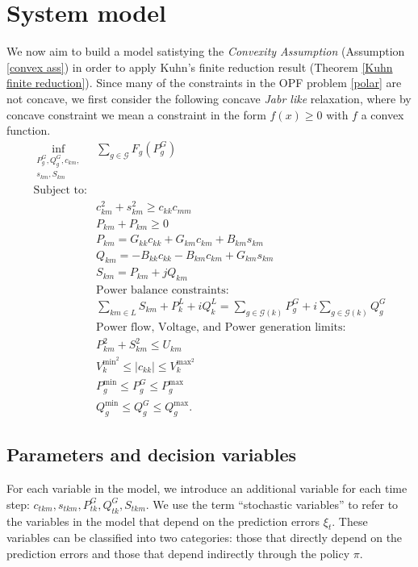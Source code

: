 \documentclass[11pt,a4paper,oneside,openany]{book}
\numberwithin{definition}{section}
\numberwithin{theorem}{section}
\numberwithin{problem}{section}
\begin{document}
\section{System model}
We now aim to build a model satistying the \emph{Convexity Assumption} (Assumption \ref{convex ass}) in order to apply Kuhn's finite reduction result (Theorem \ref{Kuhn finite reduction}). Since many of the constraints in the OPF problem \eqref{polar} are not concave, we first consider the following concave \emph{Jabr like} relaxation, where by concave constraint we mean a constraint in the form $f(x) \geq 0$ with $f$ a convex function.
\begin{align}
\label{Jabr concave relaxation}
\inf_{\substack{P^G_g, Q^G_g, c_{km},\\s_{km}, S_{km}}} & \sum_{g \in \mathcal{G}}{F_g(P_g^G)} \\
\text{Subject to:} & \nonumber \\ \label{concave Jabr constraint}
& c_{km}^2 + s_{km}^2 \geq c_{kk}c_{mm}\\ \label{power loss inequality}
& P_{km}+P_{km} \geq 0 \\ \label{active power flow}
& P_{km} = G_{kk}c_{kk}+G_{km}c_{km}+B_{km}s_{km} \\ \label{reactive power flow}
& Q_{km} = -B_{kk}c_{kk}-B_{km}c_{km}+G_{km}s_{km} \\
\label{cartesian to complex}
& S_{km} = P_{km} + jQ_{km}\\
& \text{Power balance constraints:} \nonumber \\  \label{power injection constraint}
& \sum_{km \in L}S_{km}+P_k^L+iQ_k^L = \sum_{g \in \mathcal{G}(k)}{P_g^G} + i\sum_{g \in \mathcal{G}(k)}{Q_g^G}  \\
& \text{Power flow, Voltage, and Power generation limits:} \nonumber \\ \label{power flow magnitude constraint}
& P_{km}^2 + S_{km}^2 \leq U_{km} \\ \label{voltage magnitude constraint}
& {V_k^{\text{min}^2}} \leq |c_{kk}| \leq {V_k^{\text{max}^2}} \\ \label{power generation constraint a}
& P_g^{\text{min}} \leq P_g^G \leq P_g^{\text{max}} \\
\label{power generation constraint b}
& Q_g^{\text{min}} \leq Q_g^G \leq Q_g^{\text{max}} .
\end{align}



\subsection{Parameters and decision variables}
For each variable in the model, we introduce an additional variable for each time step: $c_{tkm}, s_{tkm}, P^G_{tk}, Q^G_{tk}, S_{tkm}$. We use the term ``stochastic variables'' to refer to the variables in the model that depend on the prediction errors $\xi_t$. These variables can be classified into two categories: those that directly depend on the prediction errors  and those that depend indirectly through the policy $\pi$.
\end{document}
